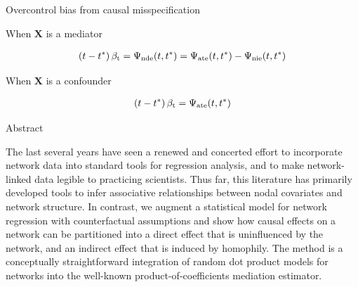 \documentclass{beamer}
\theoremstyle{remark}
\newcommand{\X}{\bm X}
\newcommand{\betat}{\beta_\text{t}}
\newcommand{\ate}{\Psi_\text{ate} \paren*{t, t^*}}
\newcommand{\nde}{\Psi_\text{nde} \paren*{t, t^*}}
\newcommand{\nie}{\Psi_\text{nie} \paren*{t, t^*}}
\DeclarePairedDelimiter{\paren}{(}{)}
\begin{document}
\begin{frame}{Overcontrol bias from causal misspecification}

    When $\X$ is a mediator

    \begin{align*}
        \paren*{t - t^*} \, \betat = \nde = \ate - \nie
    \end{align*}

    When $\X$ is a confounder

    \begin{align*}
        \paren*{t - t^*} \, \betat = \ate
    \end{align*}

\end{frame}

\begin{frame}{Abstract}

    The last several years have seen a renewed and concerted effort to incorporate network data into standard tools for regression analysis, and to make network-linked data legible to practicing scientists. Thus far, this literature has primarily developed tools to infer associative relationships between nodal covariates and network structure. In contrast, we augment a statistical model for network regression with counterfactual assumptions and show how causal effects on a network can be partitioned into a direct effect that is uninfluenced by the network, and an indirect effect that is induced by homophily. The method is a conceptually straightforward integration of random dot product models for networks into the well-known product-of-coefficients mediation estimator.

\end{frame}



\end{document}
